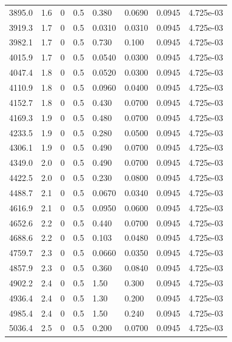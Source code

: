 \documentclass[preview]{standalone}
\begin{document}
{{{{\begin{tabular}{L{1.2cm}C{1.2cm} C{0.3cm}C{0.5cm} C{1.4cm}C{1.4cm} C{1.4cm}C{1.4cm}}
  3895.0  &   1.6  & 0     & 0.5 &  0.380  & 0.0690  & 0.0945 &  4.725e-03   \\ 
  3919.3  &   1.7  & 0     & 0.5 &  0.0310  & 0.0310  & 0.0945 &  4.725e-03   \\ 
  3982.1  &   1.7  & 0     & 0.5 &  0.730  & 0.100  & 0.0945 &  4.725e-03   \\ 
  4015.9  &   1.7  & 0     & 0.5 &  0.0540  & 0.0300  & 0.0945 &  4.725e-03   \\ 
  4047.4  &   1.8  & 0     & 0.5 &  0.0520  & 0.0300  & 0.0945 &  4.725e-03   \\ 
  4110.9  &   1.8  & 0     & 0.5 &  0.0960  & 0.0400  & 0.0945 &  4.725e-03   \\ 
  4152.7  &   1.8  & 0     & 0.5 &  0.430  & 0.0700  & 0.0945 &  4.725e-03   \\ 
  4169.3  &   1.9  & 0     & 0.5 &  0.480  & 0.0700  & 0.0945 &  4.725e-03   \\ 
  4233.5  &   1.9  & 0     & 0.5 &  0.280  & 0.0500  & 0.0945 &  4.725e-03   \\ 
  4306.1  &   1.9  & 0     & 0.5 &  0.490  & 0.0700  & 0.0945 &  4.725e-03   \\ 
  4349.0  &   2.0  & 0     & 0.5 &  0.490  & 0.0700  & 0.0945 &  4.725e-03   \\ 
  4422.5  &   2.0  & 0     & 0.5 &  0.230  & 0.0800  & 0.0945 &  4.725e-03   \\ 
  4488.7  &   2.1  & 0     & 0.5 &  0.0670  & 0.0340  & 0.0945 &  4.725e-03   \\ 
  4616.9  &   2.1  & 0     & 0.5 &  0.0950  & 0.0600  & 0.0945 &  4.725e-03   \\ 
  4652.6  &   2.2  & 0     & 0.5 &  0.440  & 0.0700  & 0.0945 &  4.725e-03   \\ 
  4688.6  &   2.2  & 0     & 0.5 &  0.103  & 0.0480  & 0.0945 &  4.725e-03   \\ 
  4759.7  &   2.3  & 0     & 0.5 &  0.0660  & 0.0350  & 0.0945 &  4.725e-03   \\ 
  4857.9  &   2.3  & 0     & 0.5 &  0.360  & 0.0840  & 0.0945 &  4.725e-03   \\ 
  4902.2  &   2.4  & 0     & 0.5 &  1.50  & 0.300  & 0.0945 &  4.725e-03   \\ 
  4936.4  &   2.4  & 0     & 0.5 &  1.30  & 0.200  & 0.0945 &  4.725e-03   \\ 
  4985.4  &   2.4  & 0     & 0.5 &  1.50  & 0.240  & 0.0945 &  4.725e-03   \\ 
  5036.4  &   2.5  & 0     & 0.5 &  0.200  & 0.0700  & 0.0945 &  4.725e-03   \\ 

\end{tabular}}}}}
\end{document}
